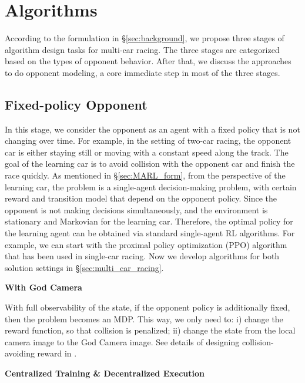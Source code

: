 

\section{Algorithms}\label{sec:alg}

According to the formulation in \S\ref{sec:background}, we propose three stages  of algorithm design tasks for multi-car racing. The three stages are categorized  based on the  types of  opponent behavior.   After that, we discuss the approaches to do opponent modeling, a core immediate step in most of the three stages. 

\subsection{Fixed-policy Opponent}
In this stage, we consider the opponent as an agent with a fixed policy that is not changing over time. For example, in the setting of two-car   racing, the opponent car is either staying still or moving with a constant speed along the track. The goal of the learning car is to avoid collision with the opponent car and finish the race quickly.  
As mentioned in \S\ref{sec:MARL_form},  from the perspective of the learning car, the problem is a single-agent decision-making problem, with certain reward and transition model that depend on the opponent policy. 
Since the opponent is not making decisions simultaneously, and the environment is stationary and Markovian for the learning car.
Therefore, the optimal policy for the learning agent can be obtained via standard single-agent RL algorithms. For example, we can start with the proximal policy optimization (PPO) algorithm \citep{schulman2017proximal} that has been used in single-car racing. 
Now we  develop algorithms for both solution settings in \S\ref{sec:multi_car_racing}. 
              
\vspace{7pt}
\noindent\textbf{With God Camera} 
\vspace{3pt}


With full observability of the state, if the opponent policy is additionally fixed, then the problem becomes an MDP. This way, we only need to: i) change the reward function, so that collision is penalized; ii) change the state from the local camera image to the God Camera image.  See details of designing collision-avoiding reward in \cite{reward_design_quip}. 

\vspace{7pt}
\noindent\textbf{Centralized Training \& Decentralized Execution}
\vspace{3pt}


